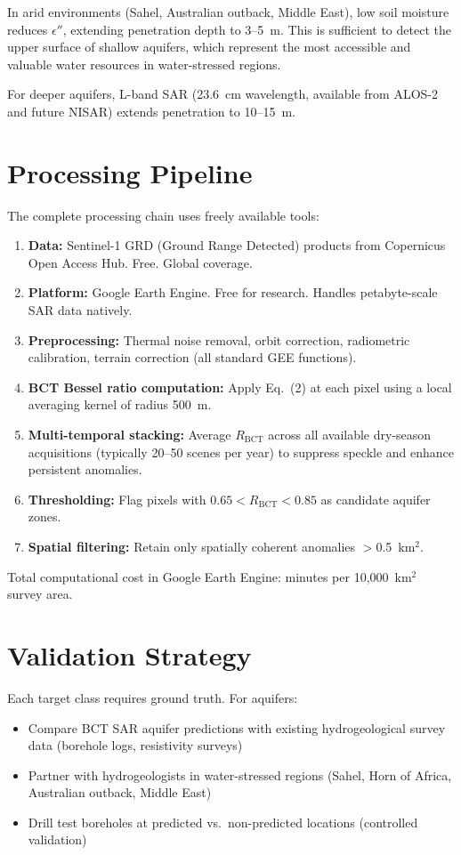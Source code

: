 \documentclass[aps,prl,twocolumn,superscriptaddress]{revtex4-2}
\begin{document}
In arid environments (Sahel, Australian outback, Middle East), low soil moisture reduces $\epsilon''$, extending penetration depth to 3--5~m. This is sufficient to detect the upper surface of shallow aquifers, which represent the most accessible and valuable water resources in water-stressed regions.

For deeper aquifers, L-band SAR (23.6~cm wavelength, available from ALOS-2 and future NISAR) extends penetration to 10--15~m.

\section{Processing Pipeline}

The complete processing chain uses freely available tools:

\begin{enumerate}
\item \textbf{Data:} Sentinel-1 GRD (Ground Range Detected) products from Copernicus Open Access Hub. Free. Global coverage.
\item \textbf{Platform:} Google Earth Engine. Free for research. Handles petabyte-scale SAR data natively.
\item \textbf{Preprocessing:} Thermal noise removal, orbit correction, radiometric calibration, terrain correction (all standard GEE functions).
\item \textbf{BCT Bessel ratio computation:} Apply Eq.~(2) at each pixel using a local averaging kernel of radius 500~m.
\item \textbf{Multi-temporal stacking:} Average $R_{\mathrm{BCT}}$ across all available dry-season acquisitions (typically 20--50 scenes per year) to suppress speckle and enhance persistent anomalies.
\item \textbf{Thresholding:} Flag pixels with $0.65 < R_{\mathrm{BCT}} < 0.85$ as candidate aquifer zones.
\item \textbf{Spatial filtering:} Retain only spatially coherent anomalies $>$0.5~km$^2$.
\end{enumerate}

Total computational cost in Google Earth Engine: minutes per 10,000~km$^2$ survey area.

\section{Validation Strategy}

Each target class requires ground truth. For aquifers:
\begin{itemize}
\item Compare BCT SAR aquifer predictions with existing hydrogeological survey data (borehole logs, resistivity surveys)
\item Partner with hydrogeologists in water-stressed regions (Sahel, Horn of Africa, Australian outback, Middle East)
\item Drill test boreholes at predicted vs.\ non-predicted locations (controlled validation)
\end{itemize}
\end{document}
